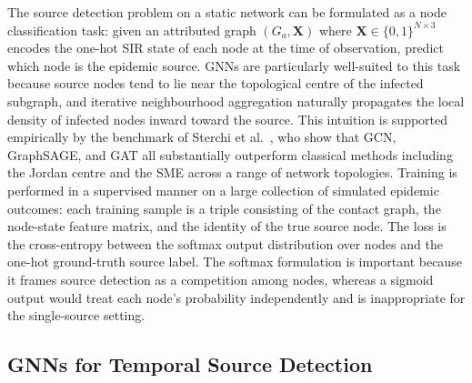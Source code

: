 The source detection problem on a static network can be formulated as a node classification task: given an attributed graph $(G_a, \mathbf{X})$ where $\mathbf{X} \in \{0,1\}^{N \times 3}$ encodes the one-hot SIR state of each node at the time of observation, predict which node is the epidemic source. GNNs are particularly well-suited to this task because source nodes tend to lie near the topological centre of the infected subgraph, and iterative neighbourhood aggregation naturally propagates the local density of infected nodes inward toward the source. This intuition is supported empirically by the benchmark of Sterchi et al.~\cite{Sterchi2025}, who show that GCN, GraphSAGE, and GAT all substantially outperform classical methods including the Jordan centre and the SME across a range of network topologies. Training is performed in a supervised manner on a large collection of simulated epidemic outcomes: each training sample is a triple consisting of the contact graph, the node-state feature matrix, and the identity of the true source node. The loss is the cross-entropy between the softmax output distribution over nodes and the one-hot ground-truth source label. The softmax formulation is important because it frames source detection as a competition among nodes, whereas a sigmoid output would treat each node's probability independently and is inappropriate for the single-source setting.

\subsection{GNNs for Temporal Source Detection}

